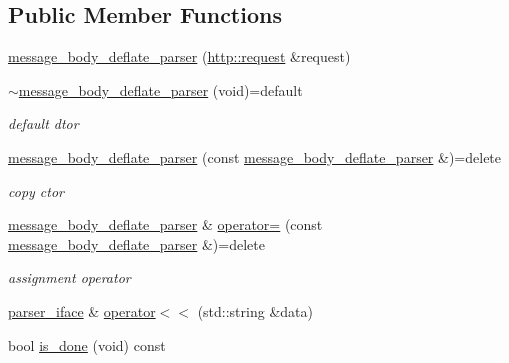 \subsection*{Public Member Functions}
\begin{DoxyCompactItemize}
\item 
\hyperlink{classnetflex_1_1parsing_1_1message__body__deflate__parser_a50f8b3c3bc5a6ad1b8bd63803d92c455}{message\+\_\+body\+\_\+deflate\+\_\+parser} (\hyperlink{classnetflex_1_1http_1_1request}{http\+::request} \&request)
\item 
\mbox{\label{classnetflex_1_1parsing_1_1message__body__deflate__parser_ad28b9d807733d8d04c9c238b95a00cca}} 
\hyperlink{classnetflex_1_1parsing_1_1message__body__deflate__parser_ad28b9d807733d8d04c9c238b95a00cca}{$\sim$message\+\_\+body\+\_\+deflate\+\_\+parser} (void)=default
\begin{DoxyCompactList}\small\item\em default dtor \end{DoxyCompactList}\item 
\mbox{\label{classnetflex_1_1parsing_1_1message__body__deflate__parser_a883c098ee9b13ef7c0986c1634794b0d}} 
\hyperlink{classnetflex_1_1parsing_1_1message__body__deflate__parser_a883c098ee9b13ef7c0986c1634794b0d}{message\+\_\+body\+\_\+deflate\+\_\+parser} (const \hyperlink{classnetflex_1_1parsing_1_1message__body__deflate__parser}{message\+\_\+body\+\_\+deflate\+\_\+parser} \&)=delete
\begin{DoxyCompactList}\small\item\em copy ctor \end{DoxyCompactList}\item 
\mbox{\label{classnetflex_1_1parsing_1_1message__body__deflate__parser_a5d5b893c9f2e32b2ec09cf16ada13c36}} 
\hyperlink{classnetflex_1_1parsing_1_1message__body__deflate__parser}{message\+\_\+body\+\_\+deflate\+\_\+parser} \& \hyperlink{classnetflex_1_1parsing_1_1message__body__deflate__parser_a5d5b893c9f2e32b2ec09cf16ada13c36}{operator=} (const \hyperlink{classnetflex_1_1parsing_1_1message__body__deflate__parser}{message\+\_\+body\+\_\+deflate\+\_\+parser} \&)=delete
\begin{DoxyCompactList}\small\item\em assignment operator \end{DoxyCompactList}\item 
\hyperlink{classnetflex_1_1parsing_1_1parser__iface}{parser\+\_\+iface} \& \hyperlink{classnetflex_1_1parsing_1_1message__body__deflate__parser_ad307d37f712b3e425bb2535f88546791}{operator$<$$<$} (std\+::string \&data)
\item 
bool \hyperlink{classnetflex_1_1parsing_1_1message__body__deflate__parser_a2e80b1cc5a930497653e200c72adc4e5}{is\+\_\+done} (void) const
\end{DoxyCompactItemize}
